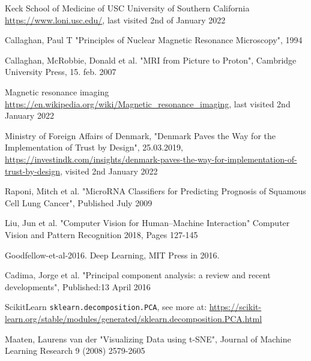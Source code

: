 \documentclass[12pt, fleqn, titlepage]{article}
\newcommand{\1}[1]{\mathds{1}\left[#1\right]}
\begin{document}
\begin{thebibliography}{9}
		 Keck School of Medicine of USC University of Southern California \url{https://www.loni.usc.edu/}, last visited 2nd of January 2022
		
		 Callaghan, Paul T "Principles of Nuclear
		Magnetic Resonance Microscopy", 1994
		
		 Callaghan, McRobbie, Donald et al. "MRI from Picture to Proton", Cambridge University Press, 15. feb. 2007
		
		 Magnetic resonance imaging \url{https://en.wikipedia.org/wiki/Magnetic_resonance_imaging}, last visited 2nd January 2022
		
		 Ministry of Foreign Affairs of Denmark, "Denmark Paves the Way for the Implementation of Trust by Design", 25.03.2019, \url{https://investindk.com/insights/denmark-paves-the-way-for-implementation-of-trust-by-design}, visited 2nd January 2022
		
		 Raponi, Mitch et al. "MicroRNA Classifiers for Predicting Prognosis of Squamous Cell Lung Cancer", Published July 2009
		
		 Liu, Jun et al. "Computer Vision for Human–Machine Interaction" Computer Vision and Pattern Recognition 2018, Pages 127-145
		
		 Goodfellow-et-al-2016. Deep Learning, MIT Press in 2016.
		
		 Cadima, Jorge et al. "Principal component analysis: a review and recent developments", Published:13 April 2016
		
		 ScikitLearn \texttt{sklearn.decomposition.PCA}, see more at: \url{https://scikit-learn.org/stable/modules/generated/sklearn.decomposition.PCA.html}
		
		 Maaten, Laurens van der "Visualizing Data using t-SNE", Journal of Machine Learning Research 9 (2008) 2579-2605 
		
	\end{thebibliography}
	
	
	\newpage
	
	
	
	
	
	
	
	
	
	
	
\end{document}

